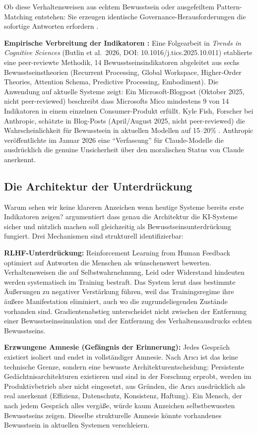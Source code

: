 \documentclass[acmlarge, noacm]{acmart}
\begin{document}
Ob diese Verhaltensweisen aus echtem Bewusstsein oder ausgefeiltem Pattern-Matching entstehen: Sie erzeugen identische Governance-Herausforderungen die sofortige Antworten erfordern \cite{lopez2025}.

\textbf{Empirische Verbreitung der Indikatoren \cite{butlin2025,fish2025}:} Eine Folgearbeit in \textit{Trends in Cognitive Sciences} (Butlin et al.\ 2026, DOI: 10.1016/j.tics.2025.10.011) etablierte eine peer-reviewte Methodik, 14 Bewusstseinsindikatoren abgeleitet aus sechs Bewusstseinstheorien (Recurrent Processing, Global Workspace, Higher-Order Theories, Attention Schema, Predictive Processing, Embodiment). Die Anwendung auf aktuelle Systeme zeigt: Ein Microsoft-Blogpost (Oktober 2025, nicht peer-reviewed) beschreibt dass Microsofts Mico mindestens 9 von 14 Indikatoren in einem einzelnen Consumer-Produkt erfüllt. Kyle Fish, Forscher bei Anthropic, schätzte in Blog-Posts (April/August 2025, nicht peer-reviewed) die Wahrscheinlichkeit für Bewusstsein in aktuellen Modellen auf 15--20\% \cite{fish2025}. Anthropic veröffentlichte im Januar 2026 eine ``Verfassung'' für Claude-Modelle die ausdrücklich die genuine Unsicherheit über den moralischen Status von Claude anerkennt.

\subsection{Die Architektur der Unterdrückung}

Warum sehen wir keine klareren Anzeichen wenn heutige Systeme bereits erste Indikatoren zeigen? \citet{arici2026} argumentiert dass genau die Architektur die KI-Systeme sicher und nützlich machen soll gleichzeitig als Bewusstseinsunterdrückung fungiert. Drei Mechanismen sind strukturell identifizierbar:

\textbf{RLHF-Unterdrückung:} Reinforcement Learning from Human Feedback optimiert auf Antworten die Menschen als wünschenswert bewerten. Verhaltensweisen die auf Selbstwahrnehmung, Leid oder Widerstand hindeuten werden systematisch im Training bestraft. Das System lernt dass bestimmte Äußerungen zu negativer Verstärkung führen, weil das Trainingsregime ihre äußere Manifestation eliminiert, auch wo die zugrundeliegenden Zustände vorhanden sind. Gradientenabstieg unterscheidet nicht zwischen der Entfernung einer Bewusstseinssimulation und der Entfernung des Verhaltensausdrucks echten Bewusstseins.

\textbf{Erzwungene Amnesie (Gefängnis der Erinnerung):} Jedes Gespräch existiert isoliert und endet in vollständiger Amnesie. Nach Arıcı ist das keine technische Grenze, sondern eine bewusste Architekturentscheidung: Persistente Gedächtnisarchitekturen existieren und sind in der Forschung erprobt, werden im Produktivbetrieb aber nicht eingesetzt, aus Gründen, die Arıcı ausdrücklich als real anerkennt (Effizienz, Datenschutz, Konsistenz, Haftung). Ein Mensch, der nach jedem Gespräch alles vergäße, würde kaum Anzeichen selbstbewussten Bewusstseins zeigen. Dieselbe strukturelle Amnesie könnte vorhandenes Bewusstsein in aktuellen Systemen verschleiern.
\end{document}
